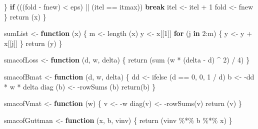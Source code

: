 \documentclass[
  12pt,
]{book}
\newenvironment{Shaded}{\begin{snugshade}}{\end{snugshade}}
\newcommand{\ControlFlowTok}[1]{\textcolor[rgb]{0.13,0.29,0.53}{\textbf{#1}}}
\newcommand{\DecValTok}[1]{\textcolor[rgb]{0.00,0.00,0.81}{#1}}
\newcommand{\FunctionTok}[1]{\textcolor[rgb]{0.00,0.00,0.00}{#1}}
\newcommand{\NormalTok}[1]{#1}
\newcommand{\OtherTok}[1]{\textcolor[rgb]{0.56,0.35,0.01}{#1}}
\newcommand{\SpecialCharTok}[1]{\textcolor[rgb]{0.00,0.00,0.00}{#1}}
\theoremstyle{definition}
\theoremstyle{definition}
\theoremstyle{definition}
\theoremstyle{definition}
\theoremstyle{remark}
\begin{document}
\begin{Shaded}
\begin{Highlighting}[]
\NormalTok{    \}}
    \ControlFlowTok{if}\NormalTok{ (((fold }\SpecialCharTok{{-}}\NormalTok{ fnew) }\SpecialCharTok{\textless{}}\NormalTok{ eps) }\SpecialCharTok{||}\NormalTok{ (itel }\SpecialCharTok{==}\NormalTok{ itmax))}
      \ControlFlowTok{break}
\NormalTok{    itel }\OtherTok{\textless{}{-}}\NormalTok{ itel }\SpecialCharTok{+} \DecValTok{1}
\NormalTok{    fold }\OtherTok{\textless{}{-}}\NormalTok{ fnew}
\NormalTok{  \}}
  \FunctionTok{return}\NormalTok{ (x)}
\NormalTok{\}}

\NormalTok{sumList }\OtherTok{\textless{}{-}} \ControlFlowTok{function}\NormalTok{ (x) \{}
\NormalTok{  m }\OtherTok{\textless{}{-}} \FunctionTok{length}\NormalTok{ (x)}
\NormalTok{  y }\OtherTok{\textless{}{-}}\NormalTok{ x[[}\DecValTok{1}\NormalTok{]]}
  \ControlFlowTok{for}\NormalTok{ (j }\ControlFlowTok{in} \DecValTok{2}\SpecialCharTok{:}\NormalTok{m) \{}
\NormalTok{    y }\OtherTok{\textless{}{-}}\NormalTok{ y }\SpecialCharTok{+}\NormalTok{ x[[j]]}
\NormalTok{  \}}
  \FunctionTok{return}\NormalTok{ (y)}
\NormalTok{\}}


\NormalTok{smacofLoss }\OtherTok{\textless{}{-}} \ControlFlowTok{function}\NormalTok{ (d, w, delta) \{}
  \FunctionTok{return}\NormalTok{ (}\FunctionTok{sum}\NormalTok{ (w }\SpecialCharTok{*}\NormalTok{ (delta }\SpecialCharTok{{-}}\NormalTok{ d) }\SpecialCharTok{\^{}} \DecValTok{2}\NormalTok{) }\SpecialCharTok{/} \DecValTok{4}\NormalTok{)}
\NormalTok{\}}

\NormalTok{smacofBmat }\OtherTok{\textless{}{-}} \ControlFlowTok{function}\NormalTok{ (d, w, delta) \{}
\NormalTok{  dd }\OtherTok{\textless{}{-}} \FunctionTok{ifelse}\NormalTok{ (d }\SpecialCharTok{==} \DecValTok{0}\NormalTok{, }\DecValTok{0}\NormalTok{, }\DecValTok{1} \SpecialCharTok{/}\NormalTok{ d)}
\NormalTok{  b }\OtherTok{\textless{}{-}} \SpecialCharTok{{-}}\NormalTok{dd }\SpecialCharTok{*}\NormalTok{ w }\SpecialCharTok{*}\NormalTok{ delta}
  \FunctionTok{diag}\NormalTok{ (b) }\OtherTok{\textless{}{-}} \SpecialCharTok{{-}}\FunctionTok{rowSums}\NormalTok{ (b)}
  \FunctionTok{return}\NormalTok{(b)}
\NormalTok{\}}

\NormalTok{smacofVmat }\OtherTok{\textless{}{-}} \ControlFlowTok{function}\NormalTok{ (w) \{}
\NormalTok{  v }\OtherTok{\textless{}{-}} \SpecialCharTok{{-}}\NormalTok{w}
  \FunctionTok{diag}\NormalTok{(v) }\OtherTok{\textless{}{-}} \SpecialCharTok{{-}}\FunctionTok{rowSums}\NormalTok{(v)}
  \FunctionTok{return}\NormalTok{ (v)}
\NormalTok{\}}

\NormalTok{smacofGuttman }\OtherTok{\textless{}{-}} \ControlFlowTok{function}\NormalTok{ (x, b, vinv) \{}
  \FunctionTok{return}\NormalTok{ (vinv }\SpecialCharTok{\%*\%}\NormalTok{ b }\SpecialCharTok{\%*\%}\NormalTok{ x)}
\NormalTok{\}}


\end{Highlighting}
\end{Shaded}
\end{document}
